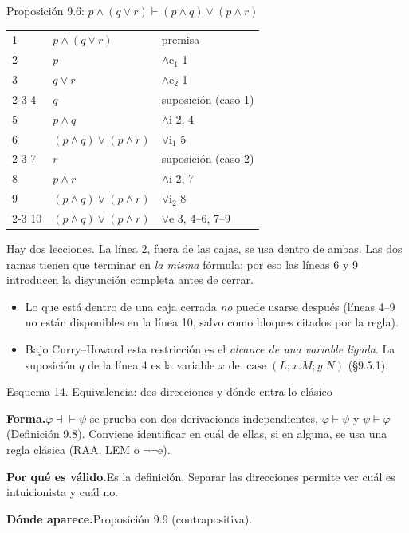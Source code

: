 \documentclass[11pt,a4paper]{article}
\newcommand{\forma}{\par\noindent\textbf{Forma.}\enspace}
\newcommand{\porque}{\par\smallskip\noindent\textbf{Por qué es válido.}\enspace}
\newcommand{\donde}{\par\smallskip\noindent\textbf{Dónde aparece.}\enspace}
\begin{document}
\begin{ejemplotesis}{Proposición 9.6: \(p\wedge(q\vee r)\vdash(p\wedge q)\vee(p\wedge r)\)}
\begin{center}
\begin{tabular}{lll}
1 & \(p\wedge(q\vee r)\) & premisa\\
2 & \(p\) & \(\wedge\)e\(_1\) 1\\
3 & \(q\vee r\) & \(\wedge\)e\(_2\) 1\\ \cline{2-3}
4 & \multicolumn{1}{|l}{\(q\)} & suposición (caso 1)\\
5 & \multicolumn{1}{|l}{\(p\wedge q\)} & \(\wedge\)i 2, 4\\
6 & \multicolumn{1}{|l}{\((p\wedge q)\vee(p\wedge r)\)} & \(\vee\)i\(_1\) 5\\ \cline{2-3}
7 & \multicolumn{1}{|l}{\(r\)} & suposición (caso 2)\\
8 & \multicolumn{1}{|l}{\(p\wedge r\)} & \(\wedge\)i 2, 7\\
9 & \multicolumn{1}{|l}{\((p\wedge q)\vee(p\wedge r)\)} & \(\vee\)i\(_2\) 8\\ \cline{2-3}
10 & \((p\wedge q)\vee(p\wedge r)\) & \(\vee\)e 3, 4--6, 7--9
\end{tabular}
\end{center}
Hay dos lecciones. La línea 2, fuera de las cajas, se usa dentro de ambas. Las
dos ramas tienen que terminar en \emph{la misma} fórmula; por eso las líneas 6
y 9 introducen la disyunción completa antes de cerrar.
\end{ejemplotesis}

\begin{trampa}
\begin{itemize}
  \item Lo que está dentro de una caja cerrada \emph{no} puede usarse
    después (líneas 4--9 no están disponibles en la línea 10, salvo como
    bloques citados por la regla).
  \item Bajo Curry--Howard esta restricción es el \emph{alcance de una
    variable ligada}. La suposición \(q\) de la línea 4 es la variable \(x\)
    de \(\operatorname{case}(L;x.M;y.N)\) (§9.5.1).
\end{itemize}
\end{trampa}

\begin{esquema}{Esquema 14. Equivalencia: dos direcciones y dónde entra lo clásico}
\forma \(\varphi\dashv\vdash\psi\) se prueba con dos derivaciones
independientes, \(\varphi\vdash\psi\) y \(\psi\vdash\varphi\)
(Definición 9.8). Conviene identificar en cuál de ellas, si en alguna, se usa
una regla clásica (RAA, LEM o \(\neg\neg\)e).

\porque Es la definición. Separar las direcciones permite ver cuál es
intuicionista y cuál no.

\donde Proposición 9.9 (contrapositiva).
\end{esquema}
\end{document}
